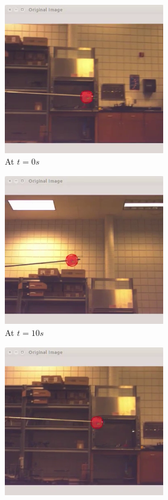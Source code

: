 \begin{figure}[htbp]
	\centering
	\begin{subfigure}{0.5\textwidth}
		\centering
		\includegraphics[height=6.5cm]{images/chapter2/gimbal_hardware_1.png}
		\caption{At $t=0s$}
	\end{subfigure}%
	\begin{subfigure}{0.5\textwidth}
		\centering
		\includegraphics[height=6.5cm]{images/chapter2/gimbal_hardware_2.png}
		\caption{At $t=10s$}
	\end{subfigure}
	\begin{subfigure}{0.5\textwidth}
		\centering
		\includegraphics[height=6.5cm]{images/chapter2/gimbal_hardware_3.png}

\end{subfigure}
\end{figure}
